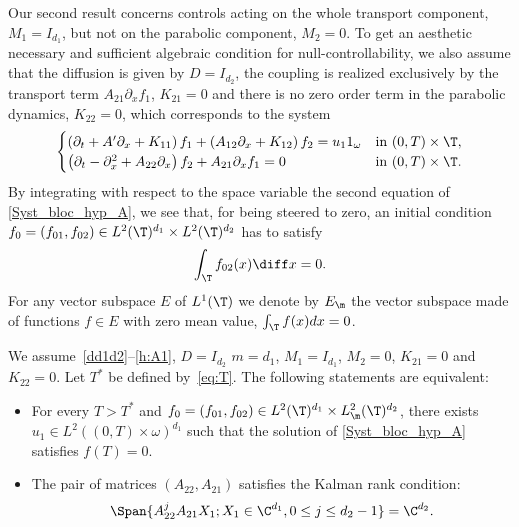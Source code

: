 Our second result concerns controls acting on the whole transport component, $M_1=I_{d_1}$, but not on the parabolic component, $M_2=0$.
To get an aesthetic necessary and sufficient algebraic condition for null-controllability, we also assume that the diffusion is given by $D=I_{d_2}$, the coupling is realized exclusively by the transport term $A_{21}\partial_x f_1$, \ie $K_{21}=0$ and there is no zero order term in the parabolic dynamics, \ie $K_{22}=0$, which corresponds to the system
\begin{equation} \label{Syst_bloc_hyp_A}
\begin{cases}
\left(\partial_t +A'\partial_x+K_{11}\right)f_1+\left(A_{12}\partial_x+K_{12}\right)f_2= u_1 1_\omega
&\text{in}\ (0,T)\times \T,\!\\
\left(\partial_t - \partial_x^2+A_{22}\partial_x\right)f_2 + A_{21}\partial_x f_1 = 0 &\text{in}\ (0,T)\times \T.
\end{cases}
\end{equation}
By integrating with respect to the space variable the second equation of \eqref{Syst_bloc_hyp_A}, we see that, for being steered to zero, an initial condition $f_0=(f_{01},f_{02})\in L^2(\T)^{d_1} \times L^2(\T)^{d_2}$ has to satisfy
\begin{equation} \label{Hyp_A_contrainte}
\int_{\T} f_{02}(x) \diff x =0.
\end{equation}
For any vector subspace $E$ of $L^1(\T)$ we denote by $E_\m$ the vector subspace made of functions $f\in E$ with zero mean value, \ie $\int_{\T} f(x)dx =0$.

\begin{theorem}\label{th:main_2}
We assume~\eqref{dd1d2}--\eqref{h:A1}, $D=I_{d_2}$ $m=d_1$, $M_1=I_{d_1}$, $M_2=0$, $K_{21}=0$ and $K_{22}=0$. Let $T^\ast$ be defined by~\eqref{eq:T}.
The following statements are equivalent:
\begin{itemize}
\item For every $T>T^{\ast}$ and $f_0=(f_{01},f_{02})\in L^2(\T)^{d_1} \times L^2_\m(\T)^{d_2}$, there exists $u_1 \in L^2((0,T)\times\omega)^{d_1}$ such that the solution of \eqref{Syst_bloc_hyp_A} satisfies $f(T)=0$.
\item The pair of matrices $(A_{22},A_{21})$ satisfies the Kalman rank condition:
\begin{equation} \label{Kalman_Thm2}
\Span \{ A_{22}^j A_{21} X_1 ; X_1 \in \C^{d_1}, 0 \leq j \leq d_2-1 \} = \C^{d_2}.
\end{equation}
\end{itemize}
\end{theorem}

